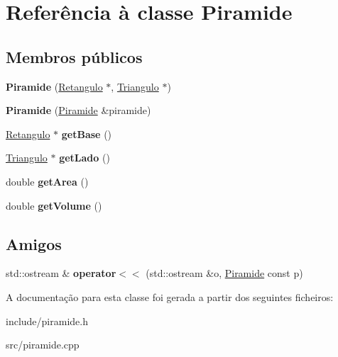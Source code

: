 \hypertarget{classPiramide}{\section{Referência à classe Piramide}
\label{classPiramide}
}
\subsection*{Membros públicos}
\begin{DoxyCompactItemize}
\item 
\hypertarget{classPiramide_a341962231a01f86ee8ce12fdfb8c3c5e}{{\bfseries Piramide} (\hyperlink{classRetangulo}{Retangulo} $\ast$, \hyperlink{classTriangulo}{Triangulo} $\ast$)}\label{classPiramide_a341962231a01f86ee8ce12fdfb8c3c5e}

\item 
\hypertarget{classPiramide_a7a8ead9b74c2b3883b84e498c549730c}{{\bfseries Piramide} (\hyperlink{classPiramide}{Piramide} \&piramide)}\label{classPiramide_a7a8ead9b74c2b3883b84e498c549730c}

\item 
\hypertarget{classPiramide_a025c997f13307b390f2215d3d193212f}{\hyperlink{classRetangulo}{Retangulo} $\ast$ {\bfseries get\-Base} ()}\label{classPiramide_a025c997f13307b390f2215d3d193212f}

\item 
\hypertarget{classPiramide_a43aa5ccd589850aaaf21b344acc99d95}{\hyperlink{classTriangulo}{Triangulo} $\ast$ {\bfseries get\-Lado} ()}\label{classPiramide_a43aa5ccd589850aaaf21b344acc99d95}

\item 
\hypertarget{classPiramide_a1b46ff2251a43374872eb9b44a01fd60}{double {\bfseries get\-Area} ()}\label{classPiramide_a1b46ff2251a43374872eb9b44a01fd60}

\item 
\hypertarget{classPiramide_aff6ba60f1ea9fbef6a79f5b4849a9207}{double {\bfseries get\-Volume} ()}\label{classPiramide_aff6ba60f1ea9fbef6a79f5b4849a9207}

\end{DoxyCompactItemize}
\subsection*{Amigos}
\begin{DoxyCompactItemize}
\item 
\hypertarget{classPiramide_ab7743dfff6fda6a4387504f8a485bbd9}{std\-::ostream \& {\bfseries operator$<$$<$} (std\-::ostream \&o, \hyperlink{classPiramide}{Piramide} const p)}\label{classPiramide_ab7743dfff6fda6a4387504f8a485bbd9}

\end{DoxyCompactItemize}


A documentação para esta classe foi gerada a partir dos seguintes ficheiros\-:\begin{DoxyCompactItemize}
\item 
include/piramide.\-h\item 
src/piramide.\-cpp\end{DoxyCompactItemize}
